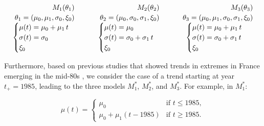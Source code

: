 \documentclass[french,a4paper,DIV=11,numbers=noendperiod]{scrartcl}
\begin{document}
\[
\begin{array}{c@{\qquad}c@{\qquad}c}
\begin{array}{c}
\begin{aligned}
M_1(\theta_1)\\[-0.2ex]
\theta_1 = (\mu_0, \mu_1, \sigma_0, \xi_0)
\end{aligned}\\[0.4ex]
\begin{cases}
\mu(t) = \mu_0 + \mu_1\, t \\
\sigma(t) = \sigma_0 \\
\xi_0
\end{cases}
\end{array}
&
\begin{array}{c}
\begin{aligned}
M_2(\theta_2)\\[-0.2ex]
\theta_2 = (\mu_0, \sigma_0, \sigma_1, \xi_0)
\end{aligned}\\[0.4ex]
\begin{cases}
\mu(t) = \mu_0 \\
\sigma(t) = \sigma_0 + \sigma_1\, t \\
\xi_0
\end{cases}
\end{array}
&
\begin{array}{c}
\begin{aligned}
M_3(\theta_3)\\[-0.2ex]
\theta_3 = (\mu_0, \mu_1, \sigma_0, \sigma_1, \xi_0)
\end{aligned}\\[0.4ex]
\begin{cases}
\mu(t) = \mu_0 + \mu_1\, t \\
\sigma(t) = \sigma_0 + \sigma_1\, t \\
\xi_0
\end{cases}
\end{array}
\end{array}
\]


Furthermore, based on previous studies that showed trends in extremes in France emerging in the mid-80s
\parencite{Blanchet2018,Ribes2019,blanchet-creutin-2022}, we consider the case of a
trend starting at year $t_{+}=1985$, leading to the three models
$M_{1}^{*}$, $M_{2}^{*}$, and $M_{3}^{*}$. For example, in $M_{1}^{*}$:

\[
\mu(t)=
\begin{cases}
\mu_{0} & \text{if } t \le 1985,\\[4pt]
\mu_{0} + \mu_{1}(t-1985) & \text{if } t \ge 1985.
\end{cases}
\]
\end{document}
